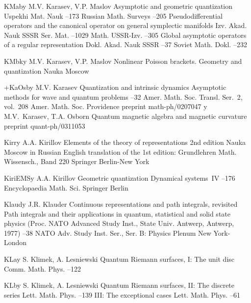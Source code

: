 \documentclass[12pt]{amsart}
\numberwithin{equation}{section}
\theoremstyle{remark}
\newcommand{\by}{\mathbf y}
\begin{document}
\begin{thebibliography}{199}
 KMab\by{ M.V. Karasev, V.P. Maslov \paper Asymptotic and geometric
quantization \jour Uspekhi Mat. Nauk   --173
\transl Russian Math. Surveys   --205 \moreref
\paper Pseudodifferential operators and the canonical operator on general
symplectic manifolds \jour Izv. Akad. Nauk SSSR Ser. Mat.  
--1029 \transl Math. USSR-Izv.   --305
\moreref \paper Global asymptotic operators of a regular representation \jour
Dokl. Akad. Nauk SSSR   --37 \transl \jour Soviet
Math. Dokl.   --232}

 KMbk\by{ M.V. Karasev, V.P. Maslov \book Nonlinear Poisson brackets.
Geometry and quantization \publ Nauka \publaddr Moscow }

 +KaOsb\by{ M.V. Karasev \paper Quantization and intrinsic dynamics
\inbook Asymptotic methods for wave and quantum problems --32 \bookinfo
Amer. Math. Soc. Transl. Ser.~2, vol.~208 \publ Amer. Math. Soc. \publaddr
Providence  \paperinfo preprint math-ph/0207047 \moreref \by
M.V.~Karasev, T.A. Osborn \paper Quantum magnetic algebra and magnetic
curvature \paperinfo preprint quant-ph/0311053}

 Kirr\by{ A.A. Kirillov \book Elements of the theory of representations
\bookinfo 2nd edition \publ Nauka \publaddr Moscow  \lang in Russian
\transl English translation of the 1st edition: Grundlehren Math. Wissensch.,
Band 220 \publ Springer \publaddr Berlin-New York }

 KiriEMS\by{ A.A. Kirillov \paper Geometric quantization \inbook
Dynamical systems~IV --176 \bookinfo Encyclopaedia Math. Sci.
 \publ Springer \publaddr Berlin }

 Klaud\by{ J.R. Klauder \paper Continuous representations and path
integrals, revisited \inbook Path integrals and their applications in quantum,
statistical and solid state physics (Proc. NATO Advanced Study Inst., State
Univ. Antwerp, Antwerp, 1977) --38 \bookinfo NATO Adv. Study Inst.
Ser., Ser. B: Physics  \publ Plenum \publaddr New York-London }

 KLa\by{ S. Klimek, A. Lesniewski \paper Quantum Riemann surfaces, I: The
unit disc \jour Comm. Math. Phys.   --122}

 KLb\by{ S. Klimek, A. Lesniewski \paper Quantum Riemann surfaces, II: The
discrete series \jour Lett. Math. Phys.   --139
\moreref \paper III: The exceptional cases \jour Lett. Math. Phys.   --61}


\end{thebibliography}
\end{document}
